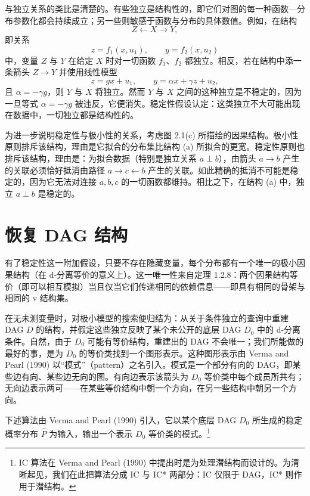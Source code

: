 与独立关系的类比是清楚的。有些独立是结构性的，即它们对图的每一种函数—分布参数化都会持续成立；另一些则敏感于函数与分布的具体数值。例如，在结构
\[
Z\leftarrow X\to Y,
\]
即关系
\begin{equation}
z=f_1(x,u_1),\qquad y=f_2(x,u_2) \tag{2.1}
\end{equation}
中，变量 $Z$ 与 $Y$ 在给定 $X$ 时对一切函数 $f_1$、$f_2$ 都独立。相反，若在结构中添一条箭头 $Z\to Y$ 并使用线性模型
\begin{equation}
z=gx+u_1,\qquad y=\alpha x+\gamma z+u_2, \tag{2.2}
\end{equation}
且 $\alpha=-\gamma g$，则 $Y$ 与 $X$ 将独立。然而 $Y$ 与 $X$ 之间的这种独立是不稳定的，因为一旦等式 $\alpha=-\gamma g$ 被违反，它便消失。稳定性假设认定：这类独立不大可能出现在数据中，一切独立都是结构性的。

为进一步说明稳定性与极小性的关系，考虑图 2.1(c) 所描绘的因果结构。极小性原则排斥该结构，理由是它拟合的分布集比结构 (a) 所拟合的更宽。稳定性原则也排斥该结构，理由是：为拟合数据（特别是独立关系 $a\perp b$），由箭头 $a\to b$ 产生的关联必须恰好抵消由路径 $a\to c\leftarrow b$ 产生的关联。如此精确的抵消不可能是稳定的，因为它无法对连接 $a,b,c$ 的一切函数都维持。相比之下，在结构 (a) 中，独立 $a\perp b$ 是稳定的。

\section{恢复 DAG 结构}

有了稳定性这一附加假设，只要不存在隐藏变量，每个分布都有一个唯一的极小因果结构（在 d-分离等价的意义上）。这一唯一性来自定理 1.2.8：两个因果结构等价（即可以相互模拟）当且仅当它们传递相同的依赖信息——即具有相同的骨架与相同的 v 结构集。

在无未测变量时，对极小模型的搜索便归结为：从关于条件独立的查询中重建 DAG $D$ 的结构，并假定这些独立反映了某个未公开的底层 DAG $D_0$ 中的 d-分离条件。自然，由于 $D_0$ 可能有等价结构，重建出的 DAG 不会唯一；我们所能做的最好的事，是为 $D_0$ 的等价类找到一个图形表示。这种图形表示由 Verma and Pearl (1990) 以“模式”（pattern）之名引入。模式是一个部分有向的 DAG，即某些边有向、某些边无向的图。有向边表示该箭头为 $D_0$ 等价类中每个成员所共有；无向边表示两可——在某些等价结构中朝一个方向，在另一些结构中朝另一个方向。

下述算法由 Verma and Pearl (1990) 引入，它以某个底层 DAG $D_0$ 所生成的稳定概率分布 $\hat{P}$ 为输入，输出一个表示 $D_0$ 等价类的模式。\footnote{IC 算法在 Verma and Pearl (1990) 中提出时是为处理潜结构而设计的。为清晰起见，我们在此把算法分成 IC 与 IC* 两部分：IC 仅限于 DAG，IC* 则作用于潜结构。}

